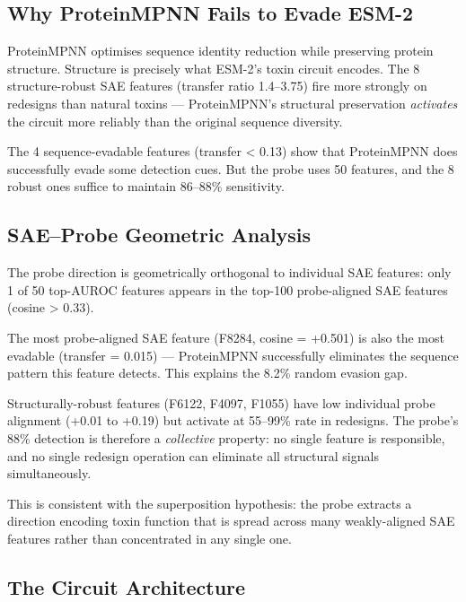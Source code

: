 \documentclass[11pt,a4paper]{article}
\begin{document}
\subsection{Why ProteinMPNN Fails to Evade ESM-2}

ProteinMPNN optimises sequence identity reduction while preserving protein structure. Structure is precisely what ESM-2's toxin circuit encodes. The 8 structure-robust SAE features (transfer ratio 1.4--3.75) fire more strongly on redesigns than natural toxins --- ProteinMPNN's structural preservation \textit{activates} the circuit more reliably than the original sequence diversity.

The 4 sequence-evadable features (transfer < 0.13) show that ProteinMPNN does successfully evade some detection cues. But the probe uses 50 features, and the 8 robust ones suffice to maintain 86--88\% sensitivity.

\subsection{SAE--Probe Geometric Analysis}

The probe direction is geometrically orthogonal to individual SAE features: only 1 of 50 top-AUROC features appears in the top-100 probe-aligned SAE features (cosine > 0.33).

The most probe-aligned SAE feature (F8284, cosine = +0.501) is also the most evadable (transfer = 0.015) --- ProteinMPNN successfully eliminates the sequence pattern this feature detects. This explains the 8.2\% random evasion gap.

Structurally-robust features (F6122, F4097, F1055) have low individual probe alignment (+0.01 to +0.19) but activate at 55--99\% rate in redesigns. The probe's 88\% detection is therefore a \textit{collective} property: no single feature is responsible, and no single redesign operation can eliminate all structural signals simultaneously.

This is consistent with the superposition hypothesis: the probe extracts a direction encoding toxin function that is spread across many weakly-aligned SAE features rather than concentrated in any single one.

\subsection{The Circuit Architecture}
\end{document}
